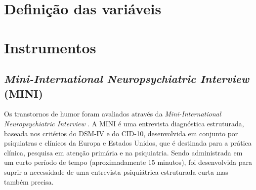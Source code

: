 \documentclass[chapter=TITLE,oneside,12pt,a4paper,english,brazil]{abntex2} %
\begin{document}
\section{Definição das variáveis}\label{sec:variaveis}

\begin{table}[H]
\end{table}

\section{Instrumentos}\label{sec:instrumentos}

    \subsection{\textit{Mini-International Neuropsychiatric Interview} (MINI)}\label{sec:mini}

        Os transtornos de humor foram avaliados através da
        \textit{Mini-International Neuropsychiatric Interview}
        \parencite{sheehan_mini-international_1998}.
        A MINI é uma entrevista diagnóstica estruturada,
        baseada nos critérios do DSM-IV e do CID-10,
        desenvolvida em conjunto por psiquiatras e clínicos da Europa e Estados Unidos,
        que é destinada para a prática clínica, pesquisa em atenção primária
        e na psiquiatria.
        Sendo administrada em um curto período de tempo (aproximadamente 15 minutos),
        foi desenvolvida para suprir a necessidade de uma entrevista psiquiátrica
        estruturada curta mas também precisa.
\end{document}
